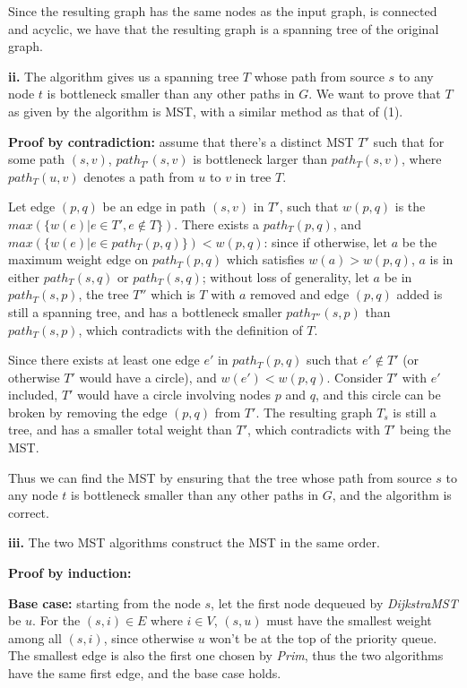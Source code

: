 \documentclass{article}
\begin{document}
\begin{description}
  Since the resulting graph has the same nodes as the input graph, is connected and acyclic, we have that the resulting graph is a spanning tree of the original graph.

  \textbf{ii.} The algorithm gives us a spanning tree $T$ whose path from source $s$ to any node $t$ is bottleneck smaller than any other paths in $G$. We want to prove that $T$ as given by the algorithm is MST, with a similar method as that of (1).

  \textbf{Proof by contradiction:} assume that there's a distinct MST $T'$ such that for some path $(s,v)$, $path_{T'}(s,v)$ is bottleneck larger than $path_{T}(s,v)$, where $path_{T}(u,v)$ denotes a path from $u$ to $v$ in tree $T$.

  Let edge $(p,q)$ be an edge in path $(s,v)$ in $T'$, such that $w(p,q)$ is the $max(\{w(e) | e \in T', e \notin T\})$. There exists a $path_{T}(p,q)$, and $max(\{w(e) | e \in path_{T}(p,q)\}) < w(p,q)$: since if otherwise, let $a$ be the maximum weight edge on $path_{T}(p,q)$ which satisfies $w(a) > w(p,q)$, $a$ is in either $path_{T}(s,q)$ or $path_{T}(s,q)$; without loss of generality, let $a$ be in $path_{T}(s,p)$, the tree $T''$ which is $T$ with $a$ removed and edge $(p,q)$ added is still a spanning tree, and has a bottleneck smaller $path_{T''}(s,p)$ than $path_{T}(s,p)$, which contradicts with the definition of $T$.

  Since there exists at least one edge $e'$ in $path_{T}(p,q)$ such that $e' \notin T'$ (or otherwise $T'$ would have a circle), and $w(e') < w(p,q)$. Consider $T'$ with $e'$ included, $T'$ would have a circle involving nodes $p$ and $q$, and this circle can be broken by removing the edge $(p,q)$ from $T'$. The resulting graph $T_{s}$ is still a tree, and has a smaller total weight than $T'$, which contradicts with $T'$ being the MST.

  Thus we can find the MST by ensuring that the tree whose path from source $s$ to any node $t$ is bottleneck smaller than any other paths in $G$, and the algorithm is correct.

  \textbf{iii.} The two MST algorithms construct the MST in the same order. 

  \textbf{Proof by induction:} 

  \textbf{Base case:} starting from the node $s$, let the first node dequeued by \textit{DijkstraMST} be $u$. For the $(s,i) \in E$ where $i \in V$, $(s,u)$ must have the smallest weight among all $(s,i)$, since otherwise $u$ won't be at the top of the priority queue. The smallest edge is also the first one chosen by \textit{Prim}, thus the two algorithms have the same first edge, and the base case holds.


\end{description}
\end{document}
